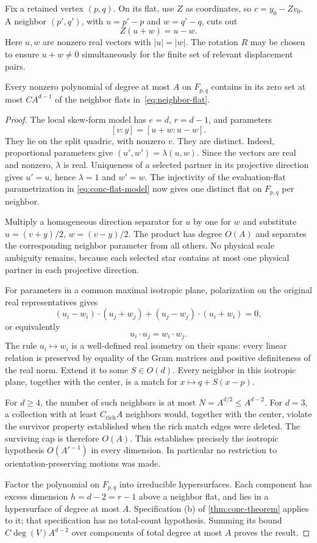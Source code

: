 Fix a retained vertex $(p,q)$. On its flat, use $Z$ as coordinates, so $c=y_0-Zv_0$. A neighbor $(p',q')$, with $u=p'-p$ and $w=q'-q$, cuts out
\begin{equation}\label{eq:neighbor-flat}
 Z(u+w)=u-w.
\end{equation}
Here $u,w$ are nonzero real vectors with $|u|=|w|$. The rotation $R$ may be chosen to ensure $u+w\ne0$ simultaneously for the finite set of relevant displacement pairs.

\begin{lemma}\label{lem:red-local-concentration}
Every nonzero polynomial of degree at most $A$ on $F_{p,q}$ contains in its zero set at most $C A^{d-1}$ of the neighbor flats in~\eqref{eq:neighbor-flat}.
\end{lemma}

\begin{proof}
The local skew-form model has $e=d$, $r=d-1$, and parameters
\[
 [v:y]=[u+w:u-w].
\]
They lie on the split quadric, with nonzero $v$. They are distinct. Indeed, proportional parameters give $(u',w')=\lambda(u,w)$. Since the vectors are real and nonzero, $\lambda$ is real. Uniqueness of a selected partner in its projective direction gives $u'=u$, hence $\lambda=1$ and $w'=w$. The injectivity of the evaluation-flat parametrization in \eqref{eq:conc-flat-model} now gives one distinct flat on $F_{p,q}$ per neighbor.

Multiply a homogeneous direction separator for $u$ by one for $w$ and substitute $u=(v+y)/2$, $w=(v-y)/2$. The product has degree $O(A)$ and separates the corresponding neighbor parameter from all others. No physical scale ambiguity remains, because each selected star contains at most one physical partner in each projective direction.

For parameters in a common maximal isotropic plane, polarization on the original real representatives gives
\[
 (u_i-w_i)\cdot(u_j+w_j)
 +(u_j-w_j)\cdot(u_i+w_i)=0,
\]
or equivalently
\[
 u_i\cdot u_j=w_i\cdot w_j.
\]
The rule $u_i\mapsto w_i$ is a well-defined real isometry on their spans: every linear relation is preserved by equality of the Gram matrices and positive definiteness of the real norm. Extend it to some $S\in O(d)$. Every neighbor in this isotropic plane, together with the center, is a match for $x\mapsto q+S(x-p)$.

For $d\ge4$, the number of such neighbors is at most $N=A^{d/2}\le A^{d-2}$. For $d=3$, a collection with at least $C_{\mathrm{rich}}A$ neighbors would, together with the center, violate the survivor property established when the rich match edges were deleted. The surviving cap is therefore $O(A)$. This establishes precisely the isotropic hypothesis $O(A^{r-1})$ in every dimension. In particular no restriction to orientation-preserving motions was made.

Factor the polynomial on $F_{p,q}$ into irreducible hypersurfaces. Each component has excess dimension $h=d-2=r-1$ above a neighbor flat, and lies in a hypersurface of degree at most $A$. Specification (b) of \cref{thm:conc-theorem} applies to it; that specification has no total-count hypothesis. Summing its bound $C\deg(V)A^{d-2}$ over components of total degree at most $A$ proves the result.
\end{proof}

